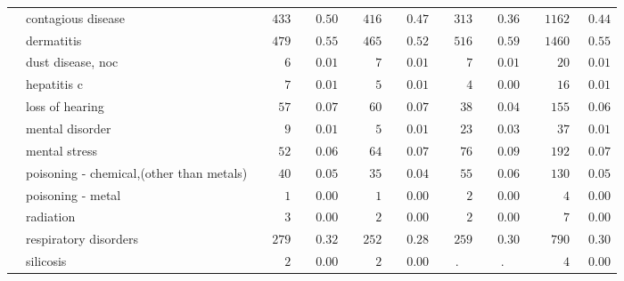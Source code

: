\documentclass[9pt, oneside]{article}   	%
\begin{document}
\begin{longtable}{p{1.8in}p{2.2in}cccccccc}
 & contagious disease  & $\phantom{00}433$ & $\phantom{00}0.50$ & $\phantom{00}416$ & $\phantom{00}0.47$ & $\phantom{00}313$ & $\phantom{00}0.36$ & $\phantom{00}1162$ & $\phantom{0}0.44$ \\
 & dermatitis  & $\phantom{00}479$ & $\phantom{00}0.55$ & $\phantom{00}465$ & $\phantom{00}0.52$ & $\phantom{00}516$ & $\phantom{00}0.59$ & $\phantom{00}1460$ & $\phantom{0}0.55$ \\
 & dust disease, noc  & $\phantom{0000}6$ & $\phantom{00}0.01$ & $\phantom{0000}7$ & $\phantom{00}0.01$ & $\phantom{0000}7$ & $\phantom{00}0.01$ & $\phantom{0000}20$ & $\phantom{0}0.01$ \\
 & hepatitis c  & $\phantom{0000}7$ & $\phantom{00}0.01$ & $\phantom{0000}5$ & $\phantom{00}0.01$ & $\phantom{0000}4$ & $\phantom{00}0.00$ & $\phantom{0000}16$ & $\phantom{0}0.01$ \\
 & loss of hearing  & $\phantom{000}57$ & $\phantom{00}0.07$ & $\phantom{000}60$ & $\phantom{00}0.07$ & $\phantom{000}38$ & $\phantom{00}0.04$ & $\phantom{000}155$ & $\phantom{0}0.06$ \\
 & mental disorder  & $\phantom{0000}9$ & $\phantom{00}0.01$ & $\phantom{0000}5$ & $\phantom{00}0.01$ & $\phantom{000}23$ & $\phantom{00}0.03$ & $\phantom{0000}37$ & $\phantom{0}0.01$ \\
 & mental stress  & $\phantom{000}52$ & $\phantom{00}0.06$ & $\phantom{000}64$ & $\phantom{00}0.07$ & $\phantom{000}76$ & $\phantom{00}0.09$ & $\phantom{000}192$ & $\phantom{0}0.07$ \\
 & poisoning - chemical,(other than metals)  & $\phantom{000}40$ & $\phantom{00}0.05$ & $\phantom{000}35$ & $\phantom{00}0.04$ & $\phantom{000}55$ & $\phantom{00}0.06$ & $\phantom{000}130$ & $\phantom{0}0.05$ \\
 & poisoning - metal  & $\phantom{0000}1$ & $\phantom{00}0.00$ & $\phantom{0000}1$ & $\phantom{00}0.00$ & $\phantom{0000}2$ & $\phantom{00}0.00$ & $\phantom{00000}4$ & $\phantom{0}0.00$ \\
 & radiation  & $\phantom{0000}3$ & $\phantom{00}0.00$ & $\phantom{0000}2$ & $\phantom{00}0.00$ & $\phantom{0000}2$ & $\phantom{00}0.00$ & $\phantom{00000}7$ & $\phantom{0}0.00$ \\
 & respiratory disorders  & $\phantom{00}279$ & $\phantom{00}0.32$ & $\phantom{00}252$ & $\phantom{00}0.28$ & $\phantom{00}259$ & $\phantom{00}0.30$ & $\phantom{000}790$ & $\phantom{0}0.30$ \\
 & silicosis  & $\phantom{0000}2$ & $\phantom{00}0.00$ & $\phantom{0000}2$ & $\phantom{00}0.00$ & . & . & $\phantom{00000}4$ & $\phantom{0}0.00$ \\

\end{longtable}
\end{document}
